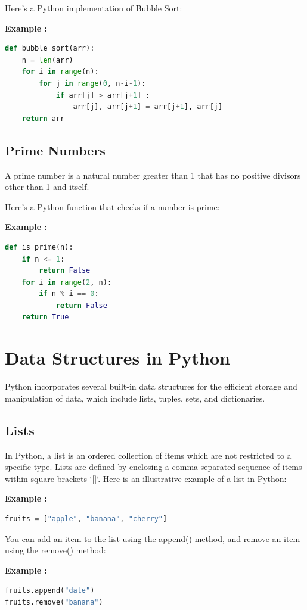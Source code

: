 \documentclass[12pt]{book}
\newtheorem{Example}{Example}[chapter]
\renewenvironment{Example}{\begin{trivlist}\item\relax
\textbf{Example \thesection: }}{\end{trivlist}}
\begin{document}
Here's a Python implementation of Bubble Sort:
\begin{Example}
\begin{lstlisting}[language=Python]
def bubble_sort(arr):
    n = len(arr)
    for i in range(n):
        for j in range(0, n-i-1):
            if arr[j] > arr[j+1] :
                arr[j], arr[j+1] = arr[j+1], arr[j]
    return arr
\end{lstlisting}
\end{Example}

\section{Prime Numbers}
A prime number is a natural number greater than 1 that has no positive divisors other than 1 and itself.


Here's a Python function that checks if a number is prime:
\begin{Example}
\begin{lstlisting}[language=Python]
def is_prime(n):
    if n <= 1:
        return False
    for i in range(2, n):
        if n % i == 0:
            return False
    return True
\end{lstlisting}
\end{Example}

\newpage
\chapter{Data Structures in Python}

Python incorporates several built-in data structures for the efficient storage and manipulation of data, which include lists, tuples, sets, and dictionaries.

\section{Lists}
In Python, a list is an ordered collection of items which are not restricted to a specific type. Lists are defined by enclosing a comma-separated sequence of items within square brackets `[]`. Here is an illustrative example of a list in Python:
\begin{Example}
\begin{lstlisting}[language=Python]
fruits = ["apple", "banana", "cherry"]
\end{lstlisting}
\end{Example}
You can add an item to the list using the append() method, and remove an item using the remove() method:
\begin{Example}
\begin{lstlisting}[language=Python]
fruits.append("date")
fruits.remove("banana")
\end{lstlisting}
\end{Example}
\end{document}
